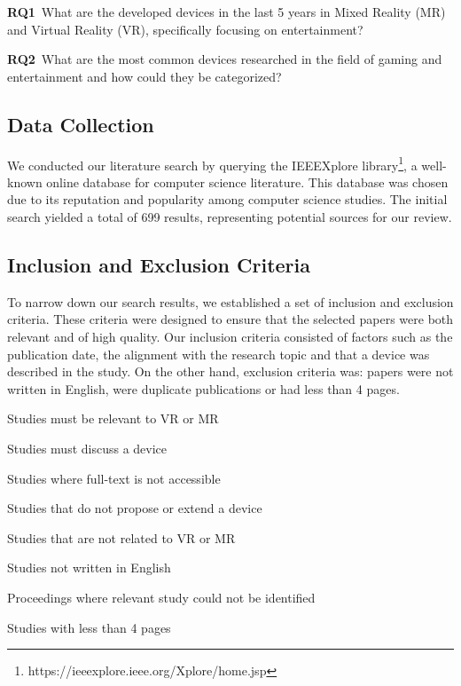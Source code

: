 \textbf{RQ1}~What are the developed devices in the last 5 years in Mixed Reality (MR) and Virtual Reality (VR), specifically focusing on entertainment? 

\textbf{RQ2}~What are the most common devices researched in the field of gaming and entertainment and how could they be categorized?

\subsection{Data Collection}
We conducted our literature search by querying the IEEEXplore library\footnote{https://ieeexplore.ieee.org/Xplore/home.jsp}, a well-known online database for computer science literature. This database was chosen due to its reputation and popularity among computer science studies. The initial search yielded a total of 699 results, representing potential sources for our review.

\subsection{Inclusion and Exclusion Criteria}
To narrow down our search results, we established a set of inclusion and exclusion criteria. These criteria were designed to ensure that the selected papers were both relevant and of high quality. Our inclusion criteria consisted of factors such as the publication date, the alignment with the research topic and that a device was described in the study. On the other hand, exclusion criteria was: papers were not written in English, were duplicate publications or had less than 4 pages.

\begin{description}
	\setlength\itemsep{-0.4em}
	\item[IC1] Studies must be relevant to VR or MR
	\item[IC2] Studies must discuss a device 
\end{description}

\begin{description}
	\setlength\itemsep{-0.4em}
	\item[EC1] Studies where full-text is not accessible
	\item[EC2] Studies that do not propose or extend a device
	\item[EC3] Studies that are not related to VR or MR
	\item[EC4] Studies not written in English
	\item[EC5] Proceedings where relevant study could not be identified
	\item[EC6] Studies with less than 4 pages
\end{description}


